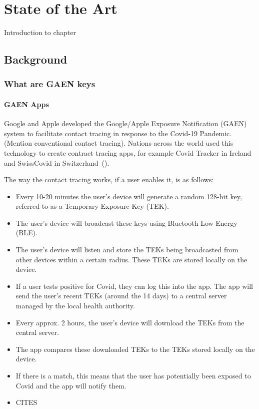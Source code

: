 \chapter{State of the Art}
Introduction to chapter

\section{Background}

\subsection{What are GAEN keys}
\subsubsection{GAEN Apps}
Google and Apple developed the Google/Apple Exposure Notification (GAEN) system to facilitate contact tracing in response to the Covid-19 Pandemic. (Mention conventional contact tracing). Nations across the world used this technology to create contract tracing apps, for example Covid Tracker in Ireland and SwissCovid in Switzerland~(\cite{9488728}).  \par

The way the contact tracing works, if a user enables it, is as follows:
\begin{itemize}
    \item Every 10-20 minutes the user's device will generate a random 128-bit key, referred to as a Temporary Exposure Key (TEK). 
    \item The user's device will broadcast these keys using Bluetooth Low Energy (BLE). 
    \item The user's device will listen and store the TEKs being broadcasted from other devices within a certain radius. These TEKs are stored locally on the device.
    \item If a user tests positive for Covid, they can log this into the app. The app will send the user's recent TEKs (around the 14 days) to a central server managed by the local health authority.
    \item Every approx. 2 hours, the user's device will download the TEKs from the central server.
    \item The app compares these downloaded TEKs to the TEKs stored locally on the device.
    \item If there is a match, this means that the user has potentially been exposed to Covid and the app will notify them. 
    \item CITES
\end{itemize}
